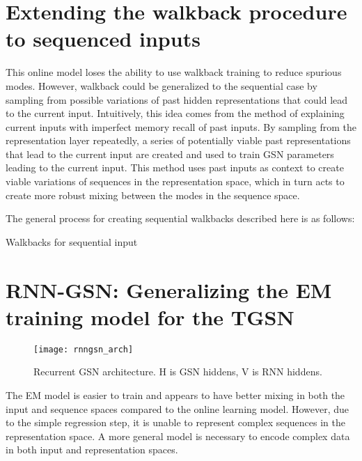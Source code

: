 \section{Extending the walkback procedure to sequenced inputs}

This online model loses the ability to use walkback training to reduce spurious modes. However, walkback could be generalized to the sequential case by sampling from possible variations of past hidden representations that could lead to the current input. Intuitively, this idea comes from the method of explaining current inputs with imperfect memory recall of past inputs. By sampling from the representation layer repeatedly, a series of potentially viable past representations that lead to the current input are created and used to train GSN parameters leading to the current input. This method uses past inputs as context to create viable variations of sequences in the representation space, which in turn acts to create more robust mixing between the modes in the sequence space.

The general process for creating sequential walkbacks described here is as follows:
\begin{algorithm}[h!]
	\caption{ Walkbacks for sequential input }
\end{algorithm}

\section{RNN-GSN: Generalizing the EM training model for the TGSN}

\begin{figure}[h!]
  \centering
    \texttt{[image: rnngsn\_arch]}
\caption{Recurrent GSN architecture. H is GSN hiddens, V is RNN hiddens.}
\end{figure}

The EM model is easier to train and appears to have better mixing in both the input and sequence spaces compared to the online learning model. However, due to the simple regression step, it is unable to represent complex sequences in the representation space. A more general model is necessary to encode complex data in both input and representation spaces.

